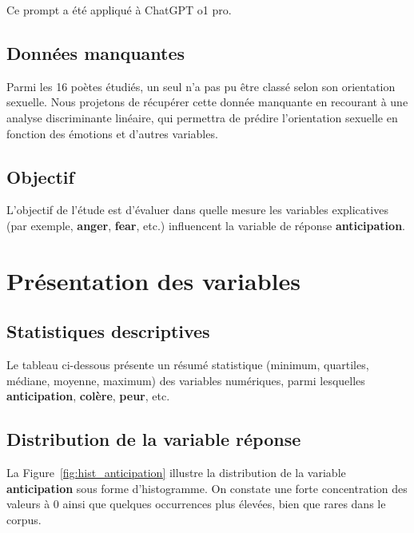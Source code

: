 \documentclass[12pt,a4paper]{article}
\begin{document}
Ce prompt a été appliqué à ChatGPT o1 pro.

\subsection{Données manquantes}
Parmi les 16 poètes étudiés, un seul n’a pas pu être classé selon son orientation sexuelle.
Nous projetons de récupérer cette donnée manquante en recourant à une analyse discriminante
linéaire, qui permettra de prédire l’orientation sexuelle en fonction des émotions
et d’autres variables.

\subsection{Objectif}
L’objectif de l’étude est d’évaluer dans quelle mesure les variables explicatives 
(par exemple, \textbf{anger}, \textbf{fear}, etc.) influencent la variable de réponse
\textbf{anticipation}.


\section{Présentation des variables}

\subsection{Statistiques descriptives}
Le tableau ci-dessous présente un résumé statistique (minimum, quartiles, médiane, moyenne, maximum)
des variables numériques, parmi lesquelles \textbf{anticipation}, \textbf{colère}, \textbf{peur}, etc.



\subsection{Distribution de la variable réponse}
La Figure~\ref{fig:hist_anticipation} illustre la distribution de la variable \textbf{anticipation}
sous forme d’histogramme. On constate une forte concentration des valeurs à 0 ainsi que
quelques occurrences plus élevées, bien que rares dans le corpus.
\end{document}
